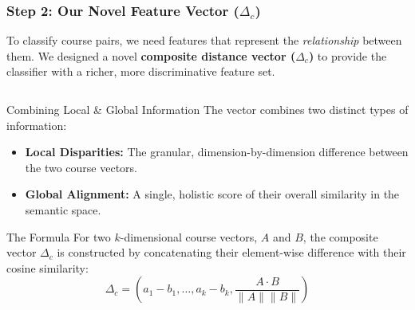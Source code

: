 \documentclass[aspectratio=169,10pt]{beamer}
\begin{document}
\begin{frame}
    \fontsize{9}{9}\selectfont
    \frametitle{Step 2: Our Novel Feature Vector (\(\Delta_c\))}

    To classify course pairs, we need features that represent the \textit{relationship} between them. We designed a novel \textbf{composite distance vector (\(\Delta_c\))} to provide the classifier with a richer, more discriminative feature set.

    \fontsize{9}{9}\selectfont
    \begin{columns}[T]
        \begin{column}{0.51\textwidth}
            \begin{block}{Combining Local \& Global Information}
                The vector combines two distinct types of information:
                \begin{itemize}
                    \item \textbf{Local Disparities:} The granular, dimension-by-dimension difference between the two course vectors.
                    \item \textbf{Global Alignment:} A single, holistic score of their overall similarity in the semantic space.
                \end{itemize}
            \end{block}
            
            \begin{alertblock}{The Formula}
                For two \(k\)-dimensional course vectors, \(A\) and \(B\), the composite vector \(\Delta_c\) is constructed by concatenating their element-wise difference with their cosine similarity:
                \[ \Delta_{c} = \left( a_{1}-b_{1}, \dots, a_{k}-b_{k}, \frac{A \cdot B}{\parallel A \parallel\parallel B\parallel} \right) \]
            \end{alertblock}

        \end{column}


\end{columns}
\end{frame}
\end{document}
